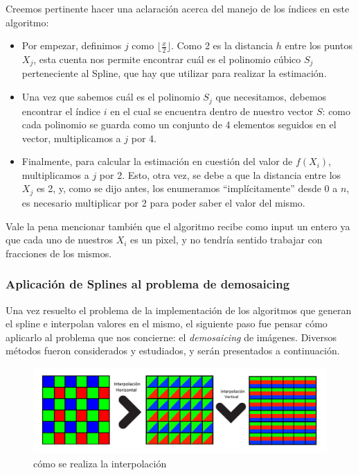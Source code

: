 \documentclass[a4paper]{article}
\begin{document}
\bigskip
Creemos pertinente hacer una aclaración acerca del manejo de los índices en este algoritmo:
\begin{itemize}
\item Por empezar, definimos $j$ como $\lfloor \frac{x}{2} \rfloor$. Como 2 es la distancia $h$ entre los puntos $X_j$, esta cuenta nos permite encontrar cuál es el polinomio cúbico $S_j$ perteneciente al Spline, que hay que utilizar para realizar la estimación.
\item Una vez que sabemos cuál es el polinomio $S_j$ que necesitamos, debemos encontrar el índice $i$ en el cual se encuentra dentro de nuestro vector $S$: como cada polinomio se guarda como un conjunto de 4 elementos seguidos en el vector, multiplicamos a $j$ por 4.
\item Finalmente, para calcular la estimación en cuestión del valor de $f(X_i)$, multiplicamos a $j$ por 2. Esto, otra vez, se debe a que la distancia entre los $X_j$ es 2, y, como se dijo antes, los enumeramos ``implícitamente'' desde 0 a $n$, es necesario multiplicar por 2 para poder saber el valor del mismo.
\end{itemize}

Vale la pena mencionar también que el algoritmo recibe como input un entero ya que cada uno de nuestros $X_i$ es un pixel, y no tendría sentido trabajar con fracciones de los mismos. \\

\subsubsection*{Aplicación de Splines al problema de demosaicing}

Una vez resuelto el problema de la implementación de los algoritmos que generan el spline e interpolan valores en el mismo, el siguiente paso fue pensar c\'omo aplicarlo al problema que nos concierne: el \textit{demosaicing} de imágenes. Diversos métodos fueron considerados y estudiados, y serán presentados a continuación. \\
\pagebreak
\begin{figure}[h!]
	\caption{cómo se realiza la interpolación}
	\begin{center}
	    \includegraphics[scale=0.47]{imagenes/Splines/splines1.png}
	\end{center}
	\label{splines1}
\end{figure}
\end{document}
